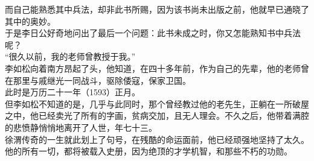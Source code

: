 \begin{multicols}{\theparacolNo}
而自己能熟悉其中兵法，却非此书所赐，因为该书尚未出版之前，他就早已通晓了其中的奥妙。\\

于是李日公好奇地问出了最后一个问题：此书未成之时，你又怎能熟知书中兵法呢？\\

“很久以前，我的老师曾教授于我。”\\

李如松向着南方昂起了头，他知道，在四十多年前，作为自己的先辈，他的老师曾在那里与戚继光一同战斗，驱除倭寇，保家卫国。\\

此时是万历二十一年（1593）正月。\\

但李如松不知道的是，几乎与此同时，那个曾经教过他的老先生，正躺在一所破屋之中，他已经卖光了所有的字画，贫病交加，且无人理会。不久之后，他带着满腔的悲愤静悄悄地离开了人世，年七十三。\\

徐渭传奇的一生就此划上了句号，在残酷的命运面前，他已经顽强地坚持了太久。他的所有一切，都将被载入史册，因为绝顶的才学机智，和那些不朽的功勋。\\
\ifnum{}
	\end{multicols}
\fi
\newpage
